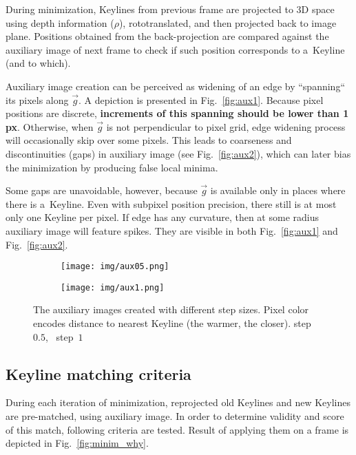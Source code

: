 During minimization, Keylines from previous frame are projected to 3D space using depth information ($\rho$), rototranslated, and then projected back to image plane. Positions obtained from the back-projection are compared against the auxiliary image of next frame to check if such position corresponds to a~Keyline (and to which).

Auxiliary image creation can be perceived as widening of an edge by ``spanning`` its pixels along $\vec{g}$. A depiction is presented in Fig.~\ref{fig:aux1}. Because pixel positions are discrete, \textbf{increments of this spanning should be lower than 1 px}. Otherwise, when $\vec{g}$ is not perpendicular to pixel grid, edge widening process will occasionally skip over some pixels. This leads to coarseness and discontinuities (gaps) in auxiliary image (see Fig.~\ref{fig:aux2}), which can later bias the minimization by producing false local minima.

Some gaps are unavoidable, however, because $\vec{g}$ is available only in places where there is a~Keyline. Even with subpixel position precision, there still is at most only one Keyline per pixel. If edge has any curvature, then at some radius auxiliary image will feature spikes. They are visible in both Fig.~\ref{fig:aux1} and Fig.~\ref{fig:aux2}.

\begin{figure}[ht]
	\centering
	\begin{subfigure}{0.49\textwidth}
		\centering\texttt{[image: img/aux05.png]}
		\subcaption{\label{fig:aux1}}
	\end{subfigure}
	\begin{subfigure}{0.49\textwidth}
		\centering\texttt{[image: img/aux1.png]}
		\subcaption{\label{fig:aux2}}
	\end{subfigure}
	\caption{\label{fig:aux}The auxiliary images created with different step sizes. Pixel color encodes distance to nearest Keyline (the warmer, the closer). \protect{} step $0.5$,
		\protect{}~step~$1$}
\end{figure}



\subsection{Keyline matching criteria}
\label{sec:minim_match}

During each iteration of minimization, reprojected old Keylines and new Keylines are pre-matched, using auxiliary image. In order to determine validity and score of this match, following criteria are tested. Result of applying them on a frame is depicted in Fig.~\ref{fig:minim_why}.

